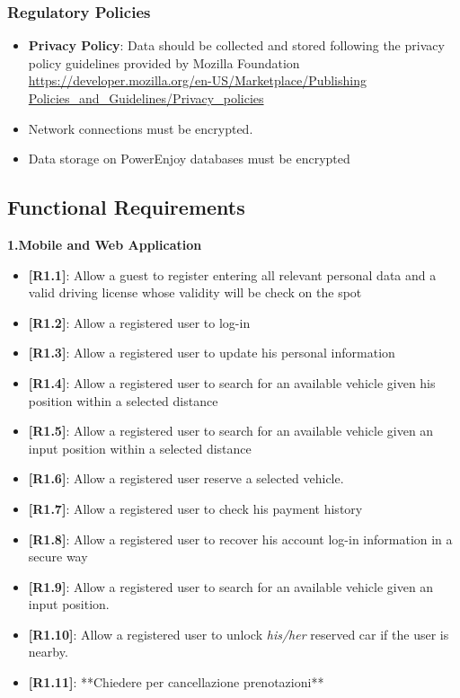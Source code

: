 \documentclass[12pt]{article}
\begin{document}
	\subsubsection{Regulatory Policies}
	\begin{itemize}
		\item \textbf{Privacy Policy}: Data should be collected and stored following the privacy policy guidelines provided by Mozilla Foundation \url{https://developer.mozilla.org/en-US/Marketplace/Publishing Policies_and_Guidelines/Privacy_policies}
		\item Network connections must be encrypted.
		\item Data storage on PowerEnjoy databases must be encrypted
	\end{itemize}
		

	\subsection{Functional Requirements}
	\textbf{1.Mobile and Web Application}
	\begin{itemize}
	 \item{\textbf{[R1.1]}}: Allow a guest to register entering all relevant personal data and a valid driving license whose validity will be check on the spot
	 \item{\textbf{[R1.2]}}: Allow a registered user to log-in
	 \item{\textbf{[R1.3]}}: Allow a registered user to update his personal information
	 \item{\textbf{[R1.4]}}: Allow a registered user to search for an available vehicle given his position within a selected distance
	 \item{\textbf{[R1.5]}}: Allow a registered user to search for an available vehicle given an input position within a selected distance
	  \item{\textbf{[R1.6]}}: Allow a registered user reserve a selected vehicle.
	 \item{\textbf{[R1.7]}}: Allow a registered user to check his payment history
	 \item{\textbf{[R1.8]}}: Allow a registered user to recover his account log-in information in a secure way
	 \item{\textbf{[R1.9]}}: Allow a registered user to search for an available vehicle given an input position.
	 \item{\textbf{[R1.10]}}: Allow a registered user to unlock \emph{his/her} reserved car if the user is nearby.
	 \item{\textbf{[R1.11]}}: **Chiedere per cancellazione prenotazioni**
	 	\end{itemize}
\end{document}
